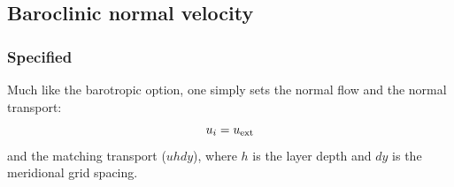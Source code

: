 \documentclass[11pt]{article}
\begin{document}
\subsection{Baroclinic normal velocity}
\subsubsection{Specified}
Much like the barotropic option, one simply sets the normal flow
and the normal transport:
\begin{equation}
  u_{i} = u_{\rm ext}
\end{equation}
and the matching transport ($u h dy$),
where $h$ is the layer depth and $dy$ is the meridional grid
spacing.

\end{document}
